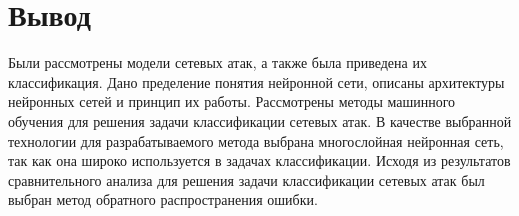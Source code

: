 \section{Вывод}

Были рассмотрены модели сетевых атак, а также была приведена их классификация.
Дано пределение понятия нейронной сети, описаны архитектуры нейронных сетей и принцип их работы.
Рассмотрены методы машинного обучения для решения задачи классификации сетевых атак.
В качестве выбранной технологии для разрабатываемого метода выбрана многослойная нейронная сеть, так как она широко используется в задачах классификации. Исходя из результатов сравнительного анализа для решения задачи классификации сетевых атак был выбран метод обратного распространения ошибки.


